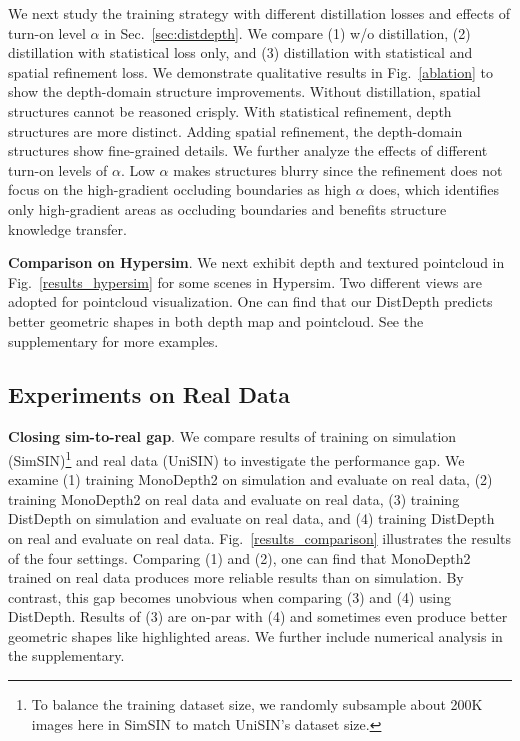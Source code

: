 \documentclass[10pt,twocolumn,letterpaper]{article}
\begin{document}
We next study the training strategy with different distillation losses and effects of turn-on level $\alpha$ in Sec.~\ref{sec:distdepth}. We compare (1) w/o distillation, (2) distillation with statistical loss only, and (3) distillation with statistical and spatial refinement loss. We demonstrate qualitative results in Fig.~\ref{ablation} to show the depth-domain structure improvements. Without distillation, spatial structures cannot be reasoned crisply. With statistical refinement, depth structures are more distinct. Adding spatial refinement, the depth-domain structures show fine-grained details. We further analyze the effects of different turn-on levels of $\alpha$. Low $\alpha$ makes structures blurry since the refinement does not focus on the high-gradient occluding boundaries as high $\alpha$ does, which identifies only high-gradient areas as occluding boundaries and benefits structure knowledge transfer.

\textbf{Comparison on Hypersim}. We next exhibit depth and textured pointcloud in Fig.~\ref{results_hypersim} for some scenes in Hypersim. Two different views are adopted for pointcloud visualization. One can find that our DistDepth predicts better geometric shapes in both depth map and pointcloud. See the supplementary for more examples.

\subsection{Experiments on Real Data}

\textbf{Closing sim-to-real gap}. We compare results of training on simulation (SimSIN)\footnote{To balance the training dataset size, we randomly subsample about 200K images here in SimSIN to match UniSIN's dataset size.} and real data (UniSIN) to investigate the performance gap.
We examine (1) training MonoDepth2 on simulation and evaluate on real data, (2) training MonoDepth2 on real data and evaluate on real data, (3) training DistDepth on simulation and evaluate on real data, and (4) training DistDepth on real and evaluate on real data. Fig.~\ref{results_comparison} illustrates the results of the four settings. Comparing (1) and (2), one can find that MonoDepth2 trained on real data produces more reliable results than on simulation. By contrast, this gap becomes unobvious when comparing (3) and (4) using DistDepth. Results of (3) are on-par with (4) and sometimes even produce better geometric shapes like highlighted areas. We further include numerical analysis in the supplementary.
\end{document}
